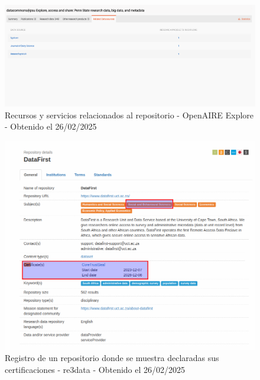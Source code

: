 \documentclass[runningheads]{llncs}
\def \bchgon {\begin{color}{blue}}
\def \echgon {\end{color}}
\begin{document}
\begin{figure}
    \centering
    \includegraphics[width=0.5\linewidth]{img/openaire_recursos_relacionados_a_repositorio.png}
    \caption{Recursos y servicios relacionados al repositorio - OpenAIRE Explore - Obtenido el 26/02/2025}
    \label{fig:openaire_recursos_relacionados_a_repositorio}
\end{figure}



\begin{figure}
    \centering
    \includegraphics[width=0.5\linewidth]{img/re3data_certified_repo.png}
    \caption{Registro de un repositorio donde se muestra declaradas sus certificaciones - re3data - Obtenido el 26/02/2025}
    \label{fig:re3data_certified_repo}
\end{figure}
\end{document}
